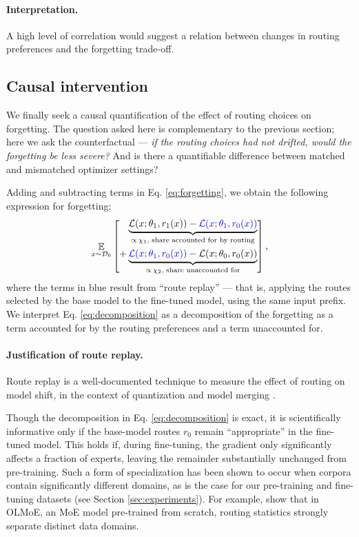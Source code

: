 \documentclass[11pt,a4paper]{article}
\DeclareMathOperator*{\E}{\mathbb{E}}
\newcommand{\D}{\mathcal{D}}
\newcommand{\Loss}{\mathcal{L}}
\begin{document}
\paragraph{Interpretation.} A high level of correlation would suggest a relation between changes in routing preferences and the forgetting trade-off.


\subsection{Causal intervention}
\label{sec:3.3}
We finally seek a causal quantification of the effect of routing choices on forgetting. The question asked here is complementary to the previous section; here we ask the counterfactual --- \textit{if the routing choices had not drifted, would the forgetting be less severe?} And is there a quantifiable difference between matched and mismatched optimizer settings?

Adding and subtracting terms in Eq. \ref{eq:forgetting}, we obtain the following expression for forgetting:
\begin{equation} \label{eq:decomposition}
\E_{x \sim \D_0}\left[
\begin{aligned}
\underbrace{\Loss(x; \theta_1, r_1(x)) - \textcolor{blue}{\Loss(x; \theta_1, r_0(x))}}_{\propto \,\chi_1 \text{, share accounted for by routing}} \\+ \underbrace{\textcolor{blue}{\Loss(x; \theta_1, r_0(x))} - \Loss(x; \theta_0, r_0(x))}_{\propto\,\chi_2 \text{, share unaccounted for}}
\end{aligned}
\right],
\end{equation}
where the terms in blue result from ``route replay'' --- that is, applying the routes selected by the base model  to the fine-tuned model, using the same input prefix. We interpret Eq. \ref{eq:decomposition} as a  decomposition of the forgetting as a term accounted for by the routing preferences and a term unaccounted for. 

\paragraph{Justification of route replay.} Route replay is a well-documented technique to measure the effect of routing on model shift, in the context of quantization \cite{chen2025eacmoeexpertselectionawarecompressor} and model merging \cite{wang2026routingdriftdoesdiagnose}.

Though the decomposition in Eq. \ref{eq:decomposition} is exact, it is scientifically informative only if the base-model routes $r_0$ remain ``appropriate'' in the fine-tuned model. This holds if, during fine-tuning, the gradient only significantly affects a fraction of experts, leaving the remainder substantially unchanged from pre-training. Such a form of specialization has been shown to occur when corpora contain significantly different domains, as is the case for our pre-training and fine-tuning datasets (see Section \ref{sec:experiments}). For example, \cite{muennighoff2025olmoeopenmixtureofexpertslanguage} show that in OLMoE, an MoE model pre-trained from scratch, routing statistics strongly separate distinct data domains. 
\end{document}
